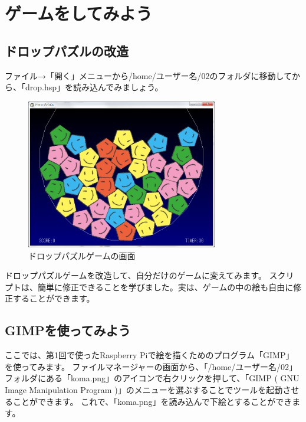 \clearpage

\section{ゲームをしてみよう}
\subsection{ドロップパズルの改造}

ファイル→「開く」メニューから/home/ユーザー名/02のフォルダに移動してから、「drop.hsp」を読み込んでみましょう。

\begin{figure}[H]
    \begin{center}
        \includegraphics[keepaspectratio,width=8.356cm,height=6.544cm]{text02-img/text02-img015.png}
        \caption{ドロップパズルゲームの画面}
    \end{center}
\end{figure}

ドロップパズルゲームを改造して、自分だけのゲームに変えてみます。
スクリプトは、簡単に修正できることを学びました。実は、ゲームの中の絵も自由に修正することができます。

\subsection{GIMPを使ってみよう}

ここでは、第1回で使ったRaspberry Piで絵を描くためのプログラム「GIMP」を使ってみます。
ファイルマネージャーの画面から、「/home/ユーザー名/02」フォルダにある「koma.png」のアイコンで右クリックを押して、「GIMP ( GNU Image Manipulation Program )」のメニューを選ぶすることでツールを起動させることができます。
これで、「koma.png」を読み込んで下絵とすることができます。


